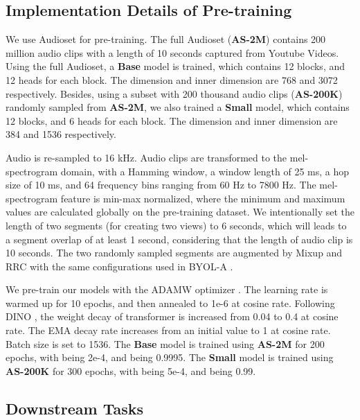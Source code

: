 \subsection{Implementation Details of Pre-training}

We use Audioset \cite{gemmeke_audio_2017} for pre-training. The full Audioset (\textbf{AS-2M}) contains 200 million audio clips with a length of 10 seconds captured from Youtube Videos. Using the full Audioset, a \textbf{Base} model is trained, which contains 12 blocks, and 12 heads for each block. The dimension and inner dimension are 768 and 3072 respectively. Besides, using a subset with 200 thousand audio clips (\textbf{AS-200K}) randomly sampled from \textbf{AS-2M}, we also trained a \textbf{Small} model, which contains 12 blocks, and 6 heads for each block. The dimension and inner dimension are 384 and 1536 respectively.

\label{sec:impdetail_pre}
 Audio is re-sampled to 16 kHz. Audio clips are transformed to the mel-spectrogram domain, with a Hamming window, a window length of 25 ms, a hop size of 10 ms, and 64 frequency bins ranging from 60 Hz to 7800 Hz. The mel-spectrogram feature is min-max normalized, where the minimum and maximum values are calculated globally on the pre-training dataset. We intentionally set the length of two segments (for creating two views) to 6 seconds, which will leads to a segment overlap of at least 1 second, considering that the length of audio clip is 10 seconds. The two randomly sampled segments are augmented by Mixup and RRC with the same configurations used in BYOL-A \cite{niizumi_byol_2021}. 
 


We pre-train our models with the ADAMW optimizer \cite{loshchilov2017fixing}. The learning rate  is warmed up for 10 epochs, and then annealed to 1e-6 at cosine rate. Following DINO \cite{caron_emerging_2021}, the weight decay of transformer is increased from 0.04 to 0.4 at cosine rate. The EMA decay rate  increases from an initial value  to 1 at cosine rate.  Batch size is set to 1536. The \textbf{Base} model is trained using \textbf{AS-2M} for 200 epochs, with  being 2e-4, and  being 0.9995.
The \textbf{Small} model is trained using \textbf{AS-200K} for 300 epochs, with  being 5e-4, and  being 0.99.


\subsection{Downstream Tasks}
\label{sec:dataset}

